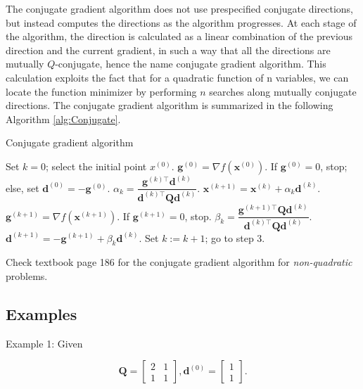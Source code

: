 The conjugate gradient algorithm does not use prespecified conjugate directions, but instead computes the directions as the algorithm progresses. At each stage of the algorithm, the direction is calculated as a linear combination of the previous direction and the current gradient, in such a way that all the directions are mutually \(Q\)-conjugate, hence the name conjugate gradient algorithm. This calculation exploits the fact that for a quadratic function of \(\mathrm{n}\) variables, we can locate the function minimizer by performing \(n\) searches along mutually conjugate directions. The conjugate gradient algorithm is summarized in the following Algorithm \ref{alg:Conjugate}.


\begin{algorithm}
\caption{Conjugate gradient algorithm} \label{alg:Conjugate}
\begin{spacing}{2}
	\begin{algorithmic}[1]
		\State Set \(k = 0\); select the initial point \(x^{(0)}\).
		\State \(\boldsymbol{g}^{(0)} = \nabla f(\boldsymbol{x}^{(0)})\). If \(\boldsymbol{g}^{(0)} = 0\), stop; else, set \(\boldsymbol{d}^{(0)} = -\boldsymbol{g}^{(0)}\).
		\State \(\alpha_k = \dfrac{\boldsymbol{g}^{(k)\top} \boldsymbol{d}^{(k)}}{\boldsymbol{d}^{(k)\top} \boldsymbol{Q} \boldsymbol{d}^{(k)}}\).
		\State \(\boldsymbol{x}^{(k+1)} = \boldsymbol{x}^{(k)} + \alpha_k \boldsymbol{d}^{(k)}\).
		\State \(\boldsymbol{g}^{(k+1)} = \nabla f(\boldsymbol{x}^{(k+1)})\). If \(\boldsymbol{g}^{(k+1)} = 0\), stop.
		\State \(\beta_k = \dfrac{\boldsymbol{g}^{(k+1)\top} \boldsymbol{Q} \boldsymbol{d}^{(k)}}{\boldsymbol{d}^{(k)\top} \boldsymbol{Q} \boldsymbol{d}^{(k)}}\).
		\State \(\boldsymbol{d}^{(k+1)} = -\boldsymbol{g}^{(k+1)} + \beta_k \boldsymbol{d}^{(k)}\).
		\State Set \(k := k + 1\); go to step 3.
	\end{algorithmic}
\end{spacing}
\end{algorithm}

Check textbook page 186 for the conjugate gradient algorithm for \textit{non-quadratic} problems.

\subsection{Examples}
Example 1: Given

\[
	\boldsymbol{Q}=\left[\begin{array}{ll}
		2 & 1 \\
		1 & 1
	\end{array}\right], \boldsymbol{d}^{(0)}=\left[\begin{array}{l}
		1 \\
		1
	\end{array}\right] .
\]

